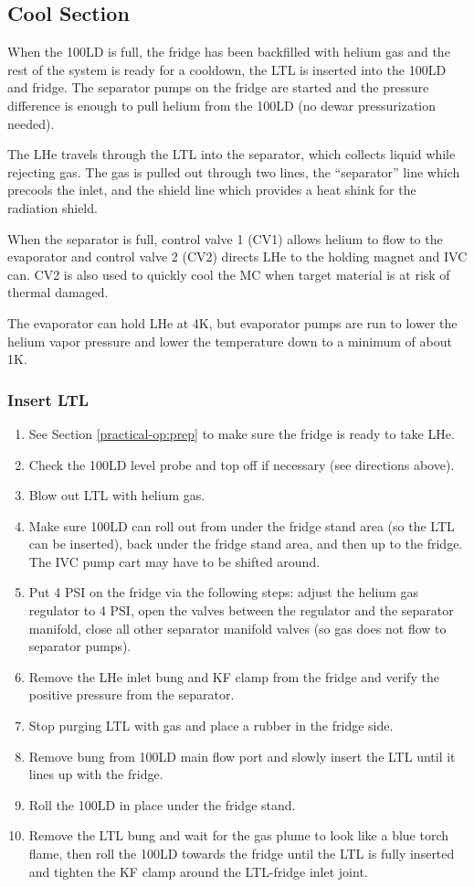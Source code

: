 \subsection{Cool \hef{} Section}

When the 100LD is full, the fridge has been backfilled with helium gas and the rest of the system is ready for a cooldown, the LTL is inserted into the 100LD and fridge.  The separator pumps on the fridge are started and the pressure difference is enough to pull helium from the 100LD (no dewar pressurization needed).

The LHe travels through the LTL into the separator, which collects liquid while rejecting gas.  The gas is pulled out through two lines, the ``separator'' line which precools the \het{} inlet, and the shield line which provides a heat shink for the radiation shield.

When the separator is full, control valve 1 (CV1) allows helium to flow to the evaporator and control valve 2 (CV2) directs LHe to the holding magnet and IVC can.  CV2 is also used to quickly cool the MC when target material is at risk of thermal damaged.

The evaporator can hold LHe at 4K, but evaporator pumps are run to lower the helium vapor pressure and lower the temperature down to a minimum of about 1K.

\subsubsection{Insert LTL}
\begin{enumerate}
 \item See Section \ref{practical-op:prep} to make sure the fridge is ready to take LHe.
 \item Check the 100LD level probe and top off if necessary (see directions above).
 \item Blow out LTL with helium gas.
 \item Make sure 100LD can roll out from under the fridge stand area (so the LTL can be inserted), back under the fridge stand area, and then up to the fridge.  The IVC pump cart may have to be shifted around.
 \item Put 4 PSI on the fridge via the following steps: adjust the helium gas regulator to 4 PSI, open the valves between the regulator and the separator manifold, close all other separator manifold valves (so gas does not flow to separator pumps).
 \item Remove the LHe inlet bung and KF clamp from the fridge and verify the positive pressure from the separator.
 \item Stop purging LTL with gas and place a rubber in the fridge side.
 \item Remove bung from 100LD main flow port and slowly insert the LTL until it lines up with the fridge.
 \item Roll the 100LD in place under the fridge stand.
 \item Remove the LTL bung and wait for the gas plume to look like a blue torch flame, then roll the 100LD towards the fridge until the LTL is fully inserted and tighten the KF clamp around the LTL-fridge inlet joint.
 \end{enumerate}
 
